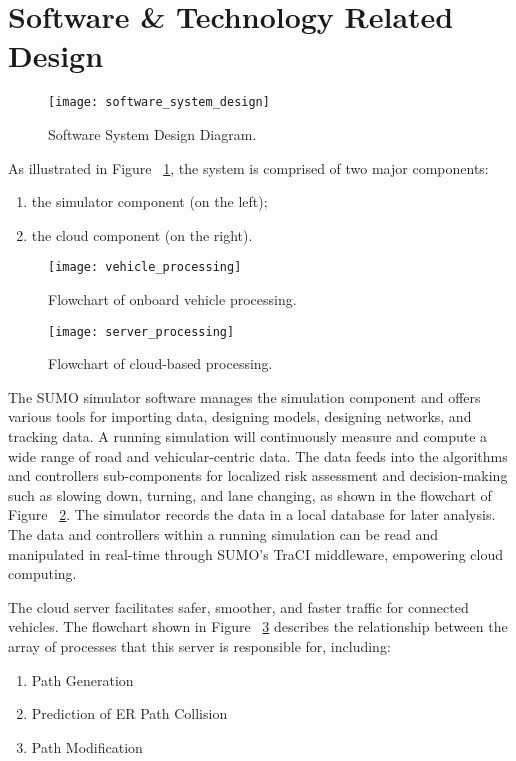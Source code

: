 \section{Software \& Technology Related Design}

	\begin{figure}
		\texttt{[image: software\_system\_design]}
		\caption{Software System Design Diagram.}
		\label{fig:software_system_design}
	\end{figure}
	
	As illustrated in Figure ~\ref{fig:software_system_design}, the system is comprised of two major components:
	\begin{enumerate}
		\item the simulator component (on the left);
		\item the cloud component (on the right).
	\end{enumerate}

	\begin{figure}
		\texttt{[image: vehicle\_processing]}
		\caption{Flowchart of onboard vehicle processing.}
		\label{fig:vehicle_processing}
	\end{figure}

	\begin{figure}
		\texttt{[image: server\_processing]}
		\caption{Flowchart of cloud-based processing.}
		\label{fig:server_processing}
	\end{figure}

	The SUMO simulator software manages the simulation component and offers various tools for importing data, designing models, designing networks, and tracking data. A running simulation will continuously measure and compute a wide range of road and vehicular-centric data. The data feeds into the algorithms and controllers sub-components for localized risk assessment and decision-making such as slowing down, turning, and lane changing, as shown in the flowchart of Figure ~\ref{fig:vehicle_processing}. The simulator records the data in a local database for later analysis. The data and controllers within a running simulation can be read and manipulated in real-time through SUMO's TraCI middleware, empowering cloud computing. 

	The cloud server facilitates safer, smoother, and faster traffic for connected vehicles. The flowchart shown in Figure ~\ref{fig:server_processing} describes the relationship between the array of processes that this server is responsible for, including:
	\begin{enumerate}
		\item Path Generation
		\item Prediction of ER Path Collision
		\item Path Modification
	\end{enumerate}

